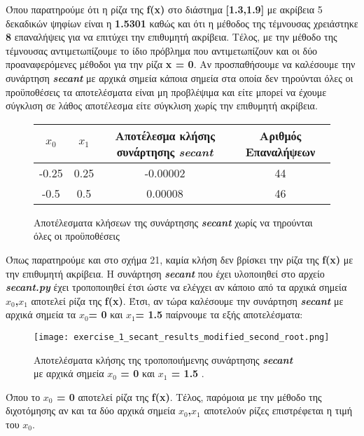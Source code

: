 \documentclass[First Project.tex]{subfiles}
\begin{document}
Όπου παρατηρούμε ότι η ρίζα της \textlatin{\textbf{f(x)}} στο διάστημα \textlatin{\textbf{[1.3,1.9]}} με ακρίβεια 5 δεκαδικών ψηφίων 
είναι η \textbf{1.5301} καθώς και ότι η μέθοδος της τέμνουσας χρειάστηκε \textbf{8} επαναλήψεις για να επιτύχει την 
επιθυμητή ακρίβεια. Τέλος, με την μέθοδο της τέμνουσας αντιμετωπίζουμε το ίδιο πρόβλημα που αντιμετωπίζουν και οι δύο προαναφερόμενες μέθοδοι
για την ρίζα \textbf{\textlatin{x = 0}}. Αν προσπαθήσουμε να καλέσουμε την συνάρτηση \textit{\textlatin{\textbf{secant}}} με αρχικά 
σημεία κάποια σημεία στα οποία δεν τηρούνται όλες οι προϋποθέσεις τα αποτελέσματα είναι μη προβλέψιμα και είτε μπορεί να έχουμε σύγκλιση σε 
λάθος αποτέλεσμα είτε σύγκλιση χωρίς την επιθυμητή ακρίβεια.
\vspace{10mm}
\begin{figure}[h!]
    \centering
    \captionsetup{justification=centering}
    \begin{center}
        \begin{tabular}{ |c|c|c|c| }       
            \hline
            \textbf{\textlatin{$x_{0}$}} & \textlatin{$x_{1}$} & Αποτέλεσμα κλήσης συνάρτησης \textit{\textlatin{\textbf{secant}}} & Αριθμός Επαναλήψεων \\
            \hline
            -0.25 & 0.25 & -0.00002 & 44 \\
            -0.5 & 0.5 & 0.00008 & 46 \\ [1ex]
            \hline
        \end{tabular}
        \caption{ Αποτέλεσματα κλήσεων της συνάρτησης \textit{\textlatin{\textbf{secant}}} χωρίς να τηρούνται όλες οι προϋποθέσεις}
    \end{center}
\end{figure}

Όπως παρατηρούμε και στο σχήμα 21, καμία κλήση δεν βρίσκει την ρίζα της \textlatin{\textbf{f(x)}} με την επιθυμητή ακρίβεια. Η συνάρτηση 
\textit{\textlatin{\textbf{secant}}} που έχει υλοποιηθεί στο αρχείο \textit{\textlatin{\textbf{secant.py}}} έχει τροποποιηθεί έτσι
ώστε να ελέγχει αν κάποιο από τα αρχικά σημεία \textbf{\textlatin{$x_{0}$,$x_{1}$}} αποτελεί ρίζα της \textlatin{\textbf{f(x)}}. Έτσι, αν τώρα
καλέσουμε την συνάρτηση \textit{\textlatin{\textbf{secant}}} με αρχικά σημεία τα \textlatin{\textbf{$x_{0}$= 0}} και 
\textlatin{\textbf{$x_{1}$= 1.5}} παίρνουμε τα εξής αποτελέσματα:
\vspace{5px}
\begin{figure}[h!]
    \centering
    \captionsetup{justification=centering}
    \begin{center}
    \texttt{[image: exercise\_1\_secant\_results\_modified\_second\_root.png]}    
    \caption{ Αποτελέσματα κλήσης της τροποποιήμενης συνάρτησης \textit{\textlatin{\textbf{secant}}} \\ με αρχικά σημεία 
                \textbf{\textlatin{$x_{0}$ = 0}} και \textbf{\textlatin{$x_{1}$ = 1.5}} . }
    \end{center}
\end{figure}

Όπου το \textbf{\textlatin{$x_{0}$ = 0}} αποτελεί ρίζα της \textlatin{\textbf{f(x)}}. Τέλος, παρόμοια με την μέθοδο της διχοτόμησης αν και τα 
δύο αρχικά σημεία \textbf{\textlatin{$x_{0}$,$x_{1}$}} αποτελούν ρίζες επιστρέφεται η τιμή του \textbf{\textlatin{$x_{0}$}}.
\newpage
\end{document}
